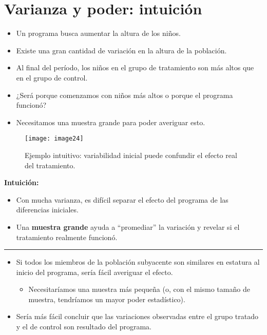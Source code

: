 \documentclass[12pt]{article}
\begin{document}
\section*{\noindent\textbf{Varianza y poder: intuición}}

\begin{itemize}
    \item Un programa busca aumentar la altura de los niños.
    \item Existe una gran cantidad de variación en la altura de la población.
    \item Al final del período, los niños en el grupo de tratamiento son más altos que en el grupo de control.
    \item ¿Será porque comenzamos con niños más altos o porque el programa funcionó?
    \item Necesitamos una muestra grande para poder averiguar esto.
\end{itemize}

\begin{figure}[H]
    \centering
    \texttt{[image: image24]}
    \caption{\footnotesize Ejemplo intuitivo: variabilidad inicial puede confundir el efecto real del tratamiento.}
\end{figure}

\textbf{Intuición:}
\begin{itemize}
    \item Con mucha varianza, es difícil separar el efecto del programa de las diferencias iniciales.  
    \item Una \textbf{muestra grande} ayuda a “promediar” la variación y revelar si el tratamiento realmente funcionó.  
\end{itemize}

\hrule

\begin{itemize}
    \item Si todos los miembros de la población subyacente son similares en estatura al inicio del programa, sería fácil averiguar el efecto.
    \begin{itemize}
        \item Necesitaríamos una muestra más pequeña (o, con el mismo tamaño de muestra, tendríamos un mayor poder estadístico).
    \end{itemize}
    \item Sería más fácil concluir que las variaciones observadas entre el grupo tratado y el de control son resultado del programa. 
\end{itemize}
\end{document}
